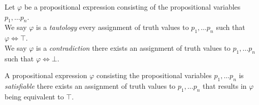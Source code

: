 \begin{definition}
    Let \(\varphi\) be a propositional expression consisting of the propositional variables \(p_1, \dots p_n\).\\
    We say \(\varphi\) is a \emph{tautology}
    \iffbydefn every assignment of truth values to \(p_1, \dots p_n\) such that \(\varphi \iff \top\).\\
    We say \(\varphi\) is a \emph{contradiction}
    \iffbydefn there exists an assignment of truth values to \(p_1, \dots p_n\) such that \(\varphi \iff \bot\).
\end{definition}
\begin{definition}[Satisfiability]
    A propositional expression \(\varphi\) consisting the propositional variables \(p_1, \dots p_n\) is \emph{satisfiable}
    \iffbydefn there exists an assignment of truth values to \(p_1, \dots p_n\) that results in \(\varphi\) being equivalent to \(\top\).
\end{definition}

